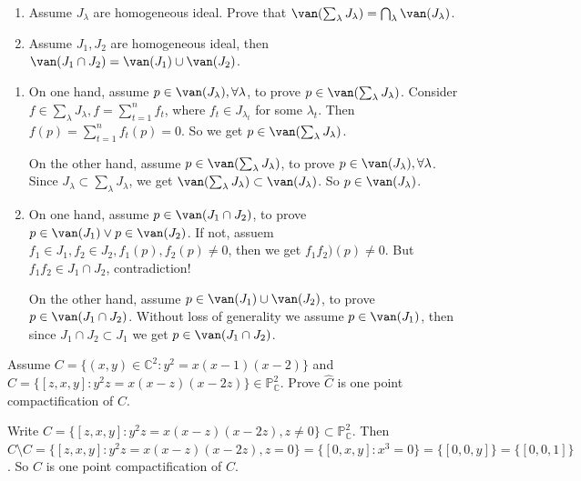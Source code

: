 \documentclass{ctexart}
\begin{document}
\begin{problem}
 \begin{enumerate}[ref=\theproblem.\arabic*]
   \item Assume \(J_{\lambda}\) are homogeneous ideal. Prove that \(\van(\sum_{\lambda}J_{\lambda} )=\bigcap_{\lambda} \van (J_{\lambda})\). 
   \item Assume \(J_1,J_2\) are homogeneous ideal, then \(\van (J_1 \cap J_2)=\van (J_1) \cup \van (J_2)\). 
 \end{enumerate} 
\end{problem}

\begin{solution}
  \begin{enumerate}
    \item On one hand, assume \(p \in \van ( J_{\lambda}), \forall \lambda\), to prove \(p \in \van (\sum_{\lambda}J_{\lambda} )\). 
      Consider \( f \in \sum_{\lambda}J_{\lambda},f=\sum_{t=1}^{n} f_t \), where \(f_t \in J_{\lambda_{t}} \) for some \(\lambda_{t}\). 
      Then \(f(p)=\sum_{t=1}^{n}f_t(p)=0 \). So we get \( p \in \van ( \sum_{\lambda}J_{\lambda} )\). 

      On the other hand, assume \(p \in \van(\sum_{\lambda} J_{\lambda})\), to prove \(p \in \van(J_{\lambda}), \forall \lambda\). 
      Since \(J_{\lambda} \subset \sum_{\lambda}J_{\lambda} \), we get \(\van(\sum_{\lambda} J_{\lambda})\subset \van ( J_{\lambda})\). 
      So \(p \in \van (J_{\lambda})\). 
    \item On one hand, assume \(p \in \van(J_1 \cap J_2)\), to prove \(p \in \van(J_1) \vee p \in \van(J_2)\). 
      If not, assuem \(f_1 \in J_1,f_2 \in J_2,f_1(p),f_2(p) \neq 0\), then we get \(f_1 f_2)(p) \neq 0\). 
      But \(f_1 f_2 \in J_1 \cap J_2\), contradiction! 

      On the other hand, assume \(p \in \van(J_1) \cup \van(J_2)\), to prove \(p \in \van(J_1 \cap J_2)\). 
      Without loss of generality we assume \(p \in \van (J_1)\), then since \(J_1 \cap J_2 \subset J_1\) we get \(p \in \van(J_1 \cap J_2)\). 
  \end{enumerate}
\end{solution}
\begin{problem}
  Assume \(C=\{(x,y) \in \mathbb{C}^2:y^2=x(x-1)(x-2)\}\) and \(\hat{C}=\{[z,x,y]:y^2z=x(x-z)(x-2z)\} \in \mathbb{P}_{\mathbb{C}}^2 \). 
  Prove \(\hat{C}\) is one point compactification of \(C\). 
\end{problem}

\begin{solution}
  Write \(C=\{[z,x,y]:y^2z=x(x-z)(x-2z),z \neq 0\} \subset \mathbb{P}_{\mathbb{C}}^2\). 
  Then \(\hat{C}\setminus C=\{[z,x,y]:y^2z=x(x-z)(x-2z),z=0\}=\{[0,x,y]:x^3=0\}=\{[0,0,y]\}=\{[0,0,1]\}\). 
  So \(\hat{C}\) is one point compactification of \(C\). 
\end{solution}
\end{document}
